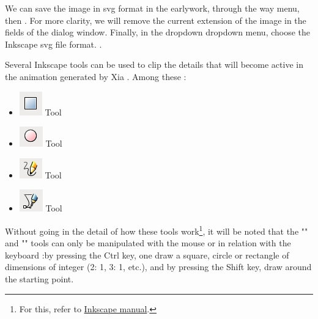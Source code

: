 We can save the image in svg format in the earlywork, 
through the way  menu, then . 
For more clarity, we will remove the current extension of the image 
in the fields  of the dialog window. Finally, in the 
dropdown dropdown menu, choose the Inkscape svg file format. .

Several Inkscape tools can be used to clip the details that
will become active in the animation generated by Xia . Among these :
\begin{itemize}
 \item \includegraphics[scale=0.5]{./images/rec_carre} Tool 
 \item \includegraphics[scale=0.5]{./images/cercles} Tool 
 \item \includegraphics[scale=0.5]{./images/lignes} Tool 
 \item \includegraphics[scale=0.5]{./images/bezier} Tool 
\end{itemize}

Without going in the detail of how these tools work\footnote{For this, 
refer to \href{http://inkscape.org/doc/shapes/tutorial-shapes.fr.html}{Inkscape manual}.}, 
it will be noted that the "" and ""  tools can only be manipulated with the mouse or 
in relation with the keyboard :by pressing the Ctrl key, one draw a square, 
circle or rectangle of dimensions of integer (2: 1, 3: 1, etc.), and 
by pressing the Shift key, draw around the starting point.

